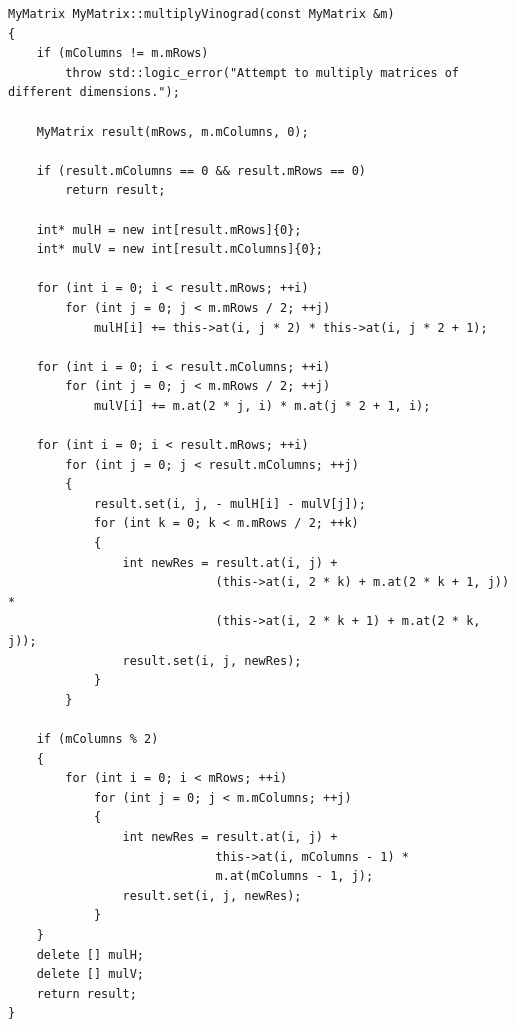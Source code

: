 \documentclass[a4paper,14pt]{report}
\begin{document}
\begin{lstlisting}[label=some-code,caption=Алгоритм Винограда]
MyMatrix MyMatrix::multiplyVinograd(const MyMatrix &m)
{
    if (mColumns != m.mRows)
        throw std::logic_error("Attempt to multiply matrices of different dimensions.");

    MyMatrix result(mRows, m.mColumns, 0);

    if (result.mColumns == 0 && result.mRows == 0)
        return result;

    int* mulH = new int[result.mRows]{0};
    int* mulV = new int[result.mColumns]{0};

    for (int i = 0; i < result.mRows; ++i)
        for (int j = 0; j < m.mRows / 2; ++j)
            mulH[i] += this->at(i, j * 2) * this->at(i, j * 2 + 1);

    for (int i = 0; i < result.mColumns; ++i)
        for (int j = 0; j < m.mRows / 2; ++j)
            mulV[i] += m.at(2 * j, i) * m.at(j * 2 + 1, i);

    for (int i = 0; i < result.mRows; ++i)
        for (int j = 0; j < result.mColumns; ++j)
        {
            result.set(i, j, - mulH[i] - mulV[j]);
            for (int k = 0; k < m.mRows / 2; ++k)
            {
                int newRes = result.at(i, j) +
                             (this->at(i, 2 * k) + m.at(2 * k + 1, j)) *
                             (this->at(i, 2 * k + 1) + m.at(2 * k, j));
                result.set(i, j, newRes);
            }
        }

    if (mColumns % 2)
    {
        for (int i = 0; i < mRows; ++i)
            for (int j = 0; j < m.mColumns; ++j)
            {
                int newRes = result.at(i, j) +
                             this->at(i, mColumns - 1) *
                             m.at(mColumns - 1, j);
                result.set(i, j, newRes);
            }
    }
    delete [] mulH;
    delete [] mulV;
    return result;
}
\end{lstlisting}
\end{document}

